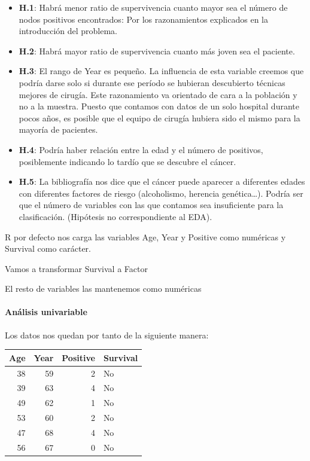 \begin{itemize}
    \item \textbf{H.1}: Habrá menor ratio de supervivencia cuanto mayor sea el número de nodos positivos encontrados: Por los razonamientos explicados en la introducción del problema.
    \item \textbf{H.2}: Habrá mayor ratio de supervivencia cuanto más joven sea el paciente.
    \item \textbf{H.3}: El rango de Year es pequeño. La influencia de esta variable creemos que podría darse solo si durante ese período se hubieran descubierto técnicas mejores de cirugía. Este razonamiento va orientado de cara a la población y no a la muestra. Puesto que contamos con datos de un solo hospital durante pocos años, es posible que el equipo de cirugía hubiera sido el mismo para la mayoría de pacientes.
    \item \textbf{H.4}: Podría haber relación entre la edad y el número de positivos, posiblemente indicando lo tardío que se descubre el cáncer.
    \item \textbf{H.5}: La bibliografía nos dice que el cáncer puede aparecer a diferentes edades con diferentes factores de riesgo (alcoholismo, herencia genética\ldots). Podría ser que el número de variables con las que contamos sea insuficiente para la clasificación. (Hipótesis no
    correspondiente al EDA).
\end{itemize}

R por defecto nos carga las variables Age, Year y Positive como numéricas y Survival como carácter.

Vamos a transformar Survival a Factor

El resto de variables las mantenemos como numéricas

\paragraph{Análisis univariable}

Los datos nos quedan por tanto de la siguiente manera:

\begin{tabular}{r|r|r|l}
    \hline
    Age & Year & Positive & Survival\\
    \hline
    38 & 59 & 2 & No\\
    \hline
    39 & 63 & 4 & No\\
    \hline
    49 & 62 & 1 & No\\
    \hline
    53 & 60 & 2 & No\\
    \hline
    47 & 68 & 4 & No\\
    \hline
    56 & 67 & 0 & No\\
    \hline
\end{tabular}

